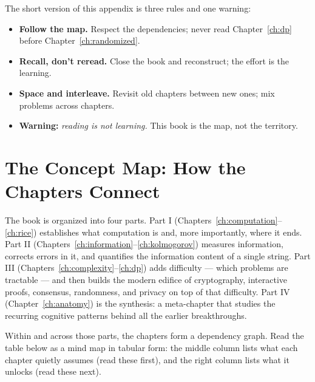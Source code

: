 The short version of this appendix is three rules and one warning:
\begin{itemize}
\item \textbf{Follow the map.} Respect the dependencies; never read Chapter~\ref{ch:dp} before Chapter~\ref{ch:randomized}.
\item \textbf{Recall, don't reread.} Close the book and reconstruct; the effort is the learning.
\item \textbf{Space and interleave.} Revisit old chapters between new ones; mix problems across chapters.
\item \textbf{Warning:} \emph{reading is not learning.} This book is the map, not the territory.
\end{itemize}

\section{The Concept Map: How the Chapters Connect}
\label{sec:learningmap:map}

The book is organized into four parts.  Part I (Chapters~\ref{ch:computation}--\ref{ch:rice}) establishes what computation is and, more importantly, where it ends. Part II (Chapters~\ref{ch:information}--\ref{ch:kolmogorov}) measures information, corrects errors in it, and quantifies the information content of a single string. Part III (Chapters~\ref{ch:complexity}--\ref{ch:dp}) adds difficulty --- which problems are tractable --- and then builds the modern edifice of cryptography, interactive proofs, consensus, randomness, and privacy on top of that difficulty. Part IV (Chapter~\ref{ch:anatomy}) is the synthesis: a meta-chapter that studies the recurring cognitive patterns behind all the earlier breakthroughs.

Within and across those parts, the chapters form a dependency graph. Read the table below as a mind map in tabular form: the middle column lists what each chapter quietly assumes (read these first), and the right column lists what it unlocks (read these next). 

